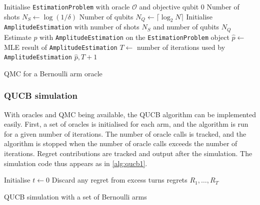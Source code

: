

\begin{algorithm}
    \SetAlgoLined
    Initialise \texttt{EstimationProblem} with oracle $\mathcal{O}$ and objective qubit 0 \;
    Number of shots $N_S \leftarrow \log(1 / \delta)$ \;
    Number of qubits $N_Q \leftarrow \lceil \log_2 N \rceil$ \;
    Initialise \texttt{AmplitudeEstimation} with number of shots $N_S$ and number of qubits $N_Q$ \;
    Estimate $p$ with \texttt{AmplitudeEstimation} on the \texttt{EstimationProblem} object \;
    $\hat{p} \leftarrow$ MLE result of \texttt{AmplitudeEstimation} \;
    $T \leftarrow$ number of iterations used by \texttt{AmplitudeEstimation} \;
    \Return $\hat{p}, T + 1$
    \caption{QMC for a Bernoulli arm oracle}
    \label{alg:qucb_qmc}
\end{algorithm}

\subsubsection{QUCB simulation}
With oracles and QMC being available, the QUCB algorithm can be implemented easily.
First, a set of oracles is initialised for each arm, and the algorithm is run for a given number of iterations.
The number of oracle calls is tracked, and the algorithm is stopped when the number of oracle calls exceeds the number of iterations.
Regret contributions are tracked and output after the simulation.
The simulation code thus appears as in \cref{alg:qucb1}.

\begin{algorithm}
    \SetAlgoLined
    Initialise $t \leftarrow 0$ \;
    Discard any regret from excess turns \;
    \Return regrets $R_1, \ldots, R_T$
    \caption{QUCB simulation with a set of Bernoulli arms}
    \label{alg:qucb1_sim}
\end{algorithm}
